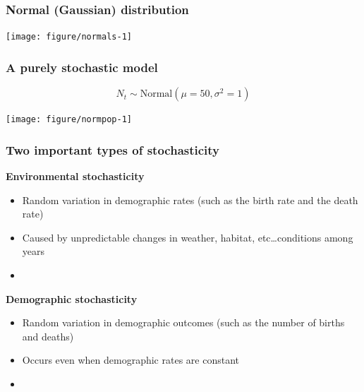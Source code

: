 \documentclass[color=usenames,dvipsnames]{beamer}\usepackage[]{graphicx}\usepackage[]{xcolor}
\newenvironment{knitrout}{}{} %
\begin{document}
\begin{frame}[fragile]
  \frametitle{Normal (Gaussian) distribution}
  \vspace{-0.7cm}
  \begin{center}
\begin{knitrout}
\color{fgcolor}
\texttt{[image: figure/normals-1]} 
\end{knitrout}
  \end{center}
\end{frame}





\begin{frame}[fragile]
  \frametitle{A purely stochastic model}
  \vspace{-3mm}
  \[
    N_t \sim \mbox{Normal}(\mu=50, \sigma^2=1)
  \]
  \vspace{-8mm}

\begin{center}
  \texttt{[image: figure/normpop-1]}
\end{center}
\end{frame}



\begin{frame}
  \frametitle{Two important types of stochasticity}
  {\bf Environmental stochasticity}
  \begin{itemize}
    \item Random variation in demographic rates (such as the birth
      rate and the death rate)
    \item Caused by unpredictable changes in weather, habitat,
      etc\dots conditions among years
    \item[]
  \end{itemize}
  \pause
  {\bf Demographic stochasticity}
  \begin{itemize}
    \item Random variation in demographic outcomes (such as the number
      of births and deaths)
    \item Occurs even when demographic rates are constant 
    \item[]
  \end{itemize}
\end{frame}
\end{document}
